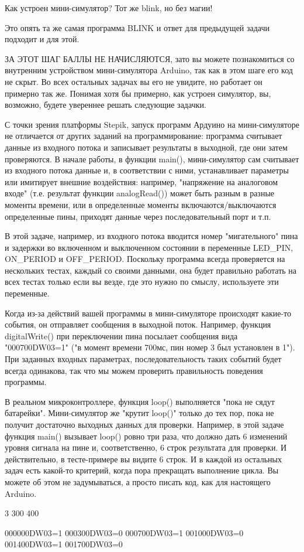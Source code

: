 
Как устроен мини-симулятор?  Тот же blink, но без магии!

Это опять та же самая программа BLINK и ответ для предыдущей задачи подходит и для этой.   

ЗА ЭТОТ ШАГ БАЛЛЫ НЕ НАЧИСЛЯЮТСЯ, зато вы можете познакомиться со внутренним устройством мини-симулятора 
Arduino, так как в этом шаге его код не скрыт.  Во всех остальных задачах вы его не увидите, но работает он примерно так же. 
Понимая хотя бы примерно, как устроен симулятор, вы, возможно, будете увереннее решать следующие задачки.
 
С точки зрения платформы Stepik, запуск программ Ардуино на мини-симуляторе не отличается от других заданий на программирование:  
программа считывает данные из входного потока и записывает результаты в выходной, где они затем проверяются.  В начале работы, в 
функции main(), мини-симулятор сам считывает из входного потока данные и, в соответствии с ними, устанавливает параметры или имитирует 
внешние воздействия:  например, "напряжение на аналоговом входе" (т.е. результат функции analogRead()) может быть разным в разные 
моменты времени, или в определенные моменты включаются/выключаются определенные пины, приходят данные через последовательный порт и т.п.   

В этой задаче, например, из входного потока вводится номер "мигательного" пина и задержки во включенном и выключенном состоянии в переменные 
LED\_PIN, ON\_PERIOD и OFF\_PERIOD.   Поскольку программа всегда проверяется на нескольких тестах, каждый со своими данными, 
она будет правильно работать на всех тестах только если вы везде, где это нужно по смыслу, используете эти переменные.

Когда из-за действий вашей программы в мини-симуляторе происходят какие-то события, он отправляет сообщения в выходной поток.  
Например, функция \linebreak digitalWrite() при переключении пина посылает сообщения вида "000700DW03=1" ("в момент времени 700мс, пин номер 3 
был установлен в 1").  При заданных входных параметрах, последовательность таких событий будет всегда одинакова, так что мы можем 
проверить правильность поведения программы.

В реальном микроконтроллере, функция loop() выполняется "пока не сядут батарейки".  Мини-симулятор же "крутит loop()" 
только до тех пор, пока не получит достаточно выходных данных для проверки.  Например, в этой задаче функция main() вызывает loop() 
ровно три раза, что должно дать 6 изменений уровня сигнала на пине и, соответственно, 6 строк результата для проверки.  И 
действительно, в тесте-примере вы видите 6 строк.   И в каждой из остальных задач есть какой-то критерий, когда пора прекращать 
выполнение цикла.  Вы можете об этом не задумываться, а просто писать код, как для настоящего Arduino.

\begin{myverbbox}[\small]{\vinput}
    3 300 400
\end{myverbbox}
\begin{myverbbox}[\small]{\voutput}
    000000DW03=1
    000300DW03=0
    000700DW03=1
    001000DW03=0
    001400DW03=1
    001700DW03=0
\end{myverbbox}

